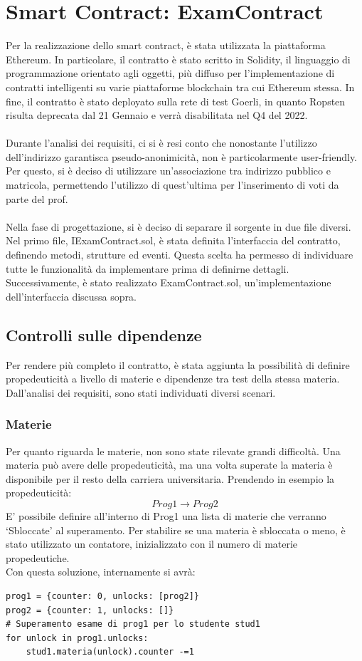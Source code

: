 \section{Smart Contract: ExamContract}

Per la realizzazione dello smart contract, è stata utilizzata la piattaforma Ethereum. In particolare, il contratto è stato scritto in Solidity, il linguaggio di programmazione orientato agli oggetti, più diffuso per l'implementazione di contratti intelligenti su varie piattaforme blockchain tra cui Ethereum stessa. In fine, il contratto è stato deployato sulla rete di test Goerli, in quanto Ropsten risulta deprecata dal 21 Gennaio e verrà disabilitata nel Q4 del 2022.\\
\\
Durante l'analisi dei requisiti, ci si è resi conto che nonostante l'utilizzo dell'indirizzo garantisca pseudo-anonimicità, non è particolarmente user-friendly. Per questo, si è deciso di utilizzare un'associazione tra indirizzo pubblico e matricola, permettendo l'utilizzo di quest'ultima per l'inserimento di voti da parte del prof.\\
\\
Nella fase di progettazione, si è deciso di separare il sorgente in due file diversi. Nel primo file, IExamContract.sol, è stata definita l'interfaccia del contratto, definendo metodi, strutture ed eventi. Questa scelta ha permesso di individuare tutte le funzionalità da implementare prima di definirne dettagli. Successivamente, è stato realizzato ExamContract.sol, un'implementazione dell'interfaccia discussa sopra.

\subsection{Controlli sulle dipendenze}
Per rendere più completo il contratto, è stata aggiunta la possibilità di definire propedeuticità a livello di materie e dipendenze tra test della stessa materia.
Dall'analisi dei requisiti, sono stati individuati diversi scenari.

\subsubsection{Materie}
Per quanto riguarda le materie, non sono state rilevate grandi difficoltà.
Una materia può avere delle propedeuticità, ma una volta superate la materia è disponibile per il resto della carriera universitaria.
Prendendo in esempio la propedeuticità:
$$
    Prog1 \rightarrow Prog2
$$
E' possibile definire all'interno di Prog1 una lista di materie che verranno `Sbloccate' al superamento. Per stabilire se una materia è sbloccata o meno, è stato utilizzato un contatore, inizializzato con il numero di materie propedeutiche.
\\
Con questa soluzione, internamente si avrà:
\begin{verbatim}
prog1 = {counter: 0, unlocks: [prog2]}
prog2 = {counter: 1, unlocks: []}
# Superamento esame di prog1 per lo studente stud1
for unlock in prog1.unlocks:
    stud1.materia(unlock).counter -=1
\end{verbatim}


